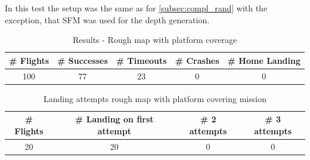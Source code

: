     In this test the setup was the same as for \cref{subsec:compl_rand} with the exception, that SFM was used for the depth generation.

    \begin{table}[h]
        \begin{center}
            \caption{Results - Rough map with platform coverage}\vspace{1ex}
            \label{tab:result_rough_covered}
            \begin{tabular}{|c|c|c|c|c|}
            \hline
            \# Flights & \# Successes & \# Timeouts & \# Crashes & \# Home Landing\\ \hline \hline
            100 & 77 & 23 & 0 & 0 \\ %
            \hline
            \end{tabular}
        \end{center}
    \end{table}

    \begin{table}[h]
        \begin{center}
            \caption{Landing attempts rough map with platform covering mission}\vspace{1ex}
            \label{tab:land_nums_rough_coverage}
            \begin{tabular}{|c|c|c|c|}
            \hline
            \# Flights & \# Landing on first attempt & \# 2 attempts & \# 3 attempts\\ \hline \hline
            20 & 20 & 0 & 0 \\%
            \hline
            \end{tabular}
        \end{center}
    \end{table}

